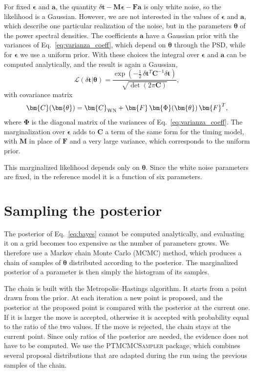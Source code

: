 For fixed $\bm{\epsilon}$ and $\bm{a}$, the quantity
$\delta\bm{t} - \bm{M}\bm{\epsilon} - \bm{F}\bm{a}$ is only white noise, so the
likelihood is a Gaussian. However, we are not interested in the values of
$\bm{\epsilon}$ and $\bm{a}$, which describe one particular realization of the
noise, but in the parameters $\bm{\theta}$ of the power spectral densities.
The coefficients $\bm{a}$ have a Gaussian prior with the variances of
Eq.~\eqref{eq:varianza_coeff}, which depend on $\bm{\theta}$ through the PSD,
while for $\bm{\epsilon}$ we use a uniform prior. With these choices the
integral over $\bm{\epsilon}$ and $\bm{a}$ can be computed analytically, and
the result is again a Gaussian,
\begin{equation}
    \mathcal{L}(\delta\bm{t}|\bm{\theta}) =
    \frac{\exp\left(-\frac{1}{2}\,\delta\bm{t}^{T}\bm{C}^{-1}\delta\bm{t}\right)}
    {\sqrt{\det(2\pi\bm{C})}},
    \label{eq:likelihood}
\end{equation}
with covariance matrix
\begin{equation}
    \bm{C}(\bm{\theta}) = \bm{C}_{\rm WN} + \bm{F}\,\bm{\Phi}(\bm{\theta})\,\bm{F}^{T},
    \label{eq:covarianza}
\end{equation}
where $\bm{\Phi}$ is the diagonal matrix of the variances of
Eq.~\eqref{eq:varianza_coeff}. The marginalization over $\bm{\epsilon}$ adds to
$\bm{C}$ a term of the same form for the timing model, with $\bm{M}$ in place
of $\bm{F}$ and a very large variance, which corresponds to the uniform prior.

This marginalized likelihood depends only on $\bm{\theta}$. Since the white
noise parameters are fixed, in the reference model it is a function of six
parameters.

\section{Sampling the posterior} \label{sec:mcmc}

The posterior of Eq.~\eqref{eq:bayes} cannot be computed analytically, and
evaluating it on a grid becomes too expensive as the number of parameters
grows. We therefore use a Markov chain Monte Carlo (MCMC) method, which
produces a chain of samples of $\bm{\theta}$ distributed according to the
posterior. The marginalized posterior of a parameter is then simply the
histogram of its samples.

The chain is built with the Metropolis--Hastings algorithm. It starts from a
point drawn from the prior. At each iteration a new point is proposed, and the
posterior at the proposed point is compared with the posterior at the current
one. If it is larger the move is accepted, otherwise it is accepted with
probability equal to the ratio of the two values. If the move is rejected, the
chain stays at the current point. Since only ratios of the posterior are
needed, the evidence does not have to be computed. We use the
\textsc{PTMCMCSampler} package, which combines several proposal distributions
that are adapted during the run using the previous samples of the chain.

